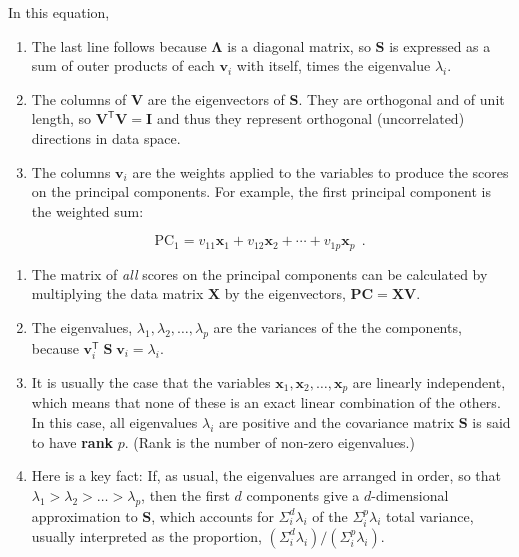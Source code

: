 \documentclass[
  letterpaper,
  10pt,
  krantz2]{krantz}
\begin{document}
In this equation,

\begin{enumerate}
\def\labelenumi{\arabic{enumi}.}
\item
  The last line follows because \(\mathbf{\Lambda}\) is a diagonal
  matrix, so \(\mathbf{S}\) is expressed as a sum of outer products of
  each \(\mathbf{v}_i\) with itself, times the eigenvalue \(\lambda_i\).
\item
  The columns of \(\mathbf{V}\) are the eigenvectors of \(\mathbf{S}\).
  They are orthogonal and of unit length, so
  \(\mathbf{V}^\mathsf{T} \mathbf{V} = \mathbf{I}\) and thus they
  represent orthogonal (uncorrelated) directions in data space.
\item
  The columns \(\mathbf{v}_i\) are the weights applied to the variables
  to produce the scores on the principal components. For example, the
  first principal component is the weighted sum:
\end{enumerate}

\[
\text{PC}_1 = v_{11} \mathbf{x}_1 + v_{12} \mathbf{x}_2 + \cdots + v_{1p} \mathbf{x}_p \:\: .
\]

\begin{enumerate}
\def\labelenumi{\arabic{enumi}.}
\setcounter{enumi}{3}
\item
  The matrix of \emph{all} scores on the principal components can be
  calculated by multiplying the data matrix \(\mathbf{X}\) by the
  eigenvectors, \(\mathbf{PC} = \mathbf{X} \mathbf{V}\).
\item
  The eigenvalues, \(\lambda_1, \lambda_2, \dots, \lambda_p\) are the
  variances of the the components, because
  \(\mathbf{v}_i^\mathsf{T} \;\mathbf{S} \; \mathbf{v}_i = \lambda_i\).
\item
  It is usually the case that the variables
  \(\mathbf{x}_1, \mathbf{x}_2, \dots, \mathbf{x}_p\) are linearly
  independent, which means that none of these is an exact linear
  combination of the others. In this case, all eigenvalues \(\lambda_i\)
  are positive and the covariance matrix \(\mathbf{S}\) is said to have
  \textbf{rank} \(p\). (Rank is the number of non-zero eigenvalues.)
\item
  Here is a key fact: If, as usual, the eigenvalues are arranged in
  order, so that \(\lambda_1 > \lambda_2 > \dots > \lambda_p\), then the
  first \(d\) components give a \(d\)-dimensional approximation to
  \(\mathbf{S}\), which accounts for \(\Sigma_i^d \lambda_i\) of the
  \(\Sigma_i^p \lambda_i\) total variance, usually interpreted as the
  proportion, \((\Sigma_i^d \lambda_i) / (\Sigma_i^p \lambda_i)\).
\end{enumerate}
\end{document}
